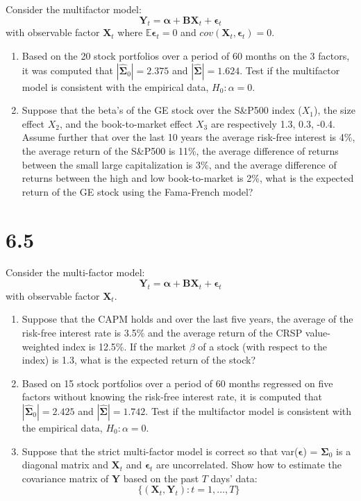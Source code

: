 \documentclass[11pt,]{article}
\providecommand{\tightlist}{%
\setlength{\itemsep}{0pt}\setlength{\parskip}{0pt}}
\begin{document}
Consider the multifactor model: \[
{\bm{{Y}}}_t = {\bm{{\alpha}}} + {\bm{{B}}}{\bm{{X}}}_t + {\bm{{\epsilon}}}_t
\] with observable factor \({\bm{{X}}}_t\) where
\(\mathbb{E}{\bm{{\epsilon}}}_t =0\) and
\(cov({\bm{{X}}}_t, {\bm{{\epsilon}}}_t) = 0\).

\begin{enumerate}
\def\labelenumi{\arabic{enumi}.}
\tightlist
\item
  Based on the 20 stock portfolios over a period of 60 months on the 3
  factors, it was computed that \(|{\bm{{\hat{\Sigma}}}}_0| = 2.375\)
  and \(|{\bm{{\hat{\Sigma}}}}| = 1.624\). Test if the multifactor model
  is consistent with the empirical data, \(H_0: \alpha = 0\).
\item
  Suppose that the beta's of the GE stock over the S\&P500 index
  (\(X_1\)), the size effect \(X_2\), and the book-to-market effect
  \(X_3\) are respectively 1.3, 0.3, -0.4. Assume further that over the
  last 10 years the average risk-free interest is 4\%, the average
  return of the S\&P500 is 11\%, the average difference of returns
  between the small large capitalization is 3\%, and the average
  difference of returns between the high and low book-to-market is 2\%,
  what is the expected return of the GE stock using the Fama-French
  model?
\end{enumerate}

\newpage

\hypertarget{section-2}{%
\section{6.5}\label{section-2}}

Consider the multi-factor model: \[
{\bm{{Y}}}_t = {\bm{{\alpha}}} + {\bm{{B}}}{\bm{{X}}}_t + {\bm{{\epsilon}}}_t
\] with observable factor \({\bm{{X}}}_t\).

\begin{enumerate}
\def\labelenumi{\arabic{enumi}.}
\tightlist
\item
  Suppose that the CAPM holds and over the last five years, the average
  of the risk-free interest rate is 3.5\% and the average return of the
  CRSP value-weighted index is 12.5\%. If the market \(\beta\) of a
  stock (with respect to the index) is 1.3, what is the expected return
  of the stock?
\item
  Based on 15 stock portfolios over a period of 60 months regressed on
  five factors without knowing the risk-free interest rate, it is
  computed that \(|{\bm{{\hat{\Sigma}}}}_0| = 2.425\) and
  \(|{\bm{{\hat{\Sigma}}}}| = 1.742\). Test if the multifactor model is
  consistent with the empirical data, \(H_0: \alpha = 0\).\\
\item
  Suppose that the strict multi-factor model is correct so that
  var(\({\bm{{\epsilon}}}\)) = \({\bm{{\Sigma}}}_0\) is a diagonal
  matrix and \({\bm{{X}}}_t\) and \({\bm{{\epsilon}}}_t\) are
  uncorrelated. Show how to estimate the covariance matrix of
  \({\bm{{Y}}}\) based on the past \(T\) days' data: \[
  \{({\bm{{X}}}_t, {\bm{{Y}}}_t): t = 1, \ldots, T\}
  \]
\end{enumerate}
\end{document}
